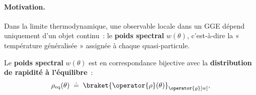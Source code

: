 

\paragraph{Motivation.}

Dans la limite thermodynamique, une observable locale dans un \gls{GGE} dépend uniquement d’un objet continu : le \textbf{poids spectral} $w(\theta)$, c’est-à-dire la « température généralisée » assignée à chaque quasi‑particule.
 

\medskip

Le \textbf{poids spectral} $w(\theta)$ est en correspondance bijective avec la \textbf{distribution de rapidité à l’équilibre} :
\begin{eqnarray}\label{chap.2:eq.rho.eq.1}
	\rho_{\mathrm{eq}}(\theta)\;\doteq\;\braket{\operator{\rho}(\theta)}_{\operator{\varrho}[w]}	,  
\end{eqnarray}

